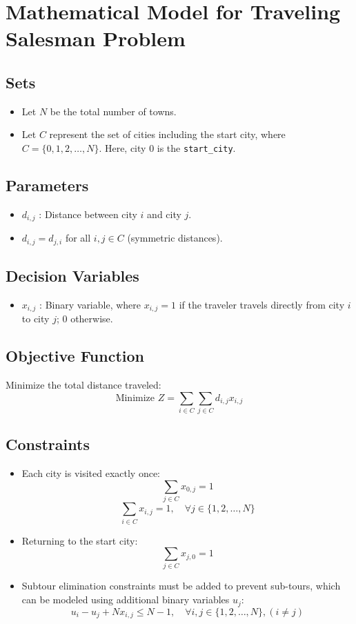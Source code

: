 \documentclass{article}
\begin{document}
\section*{Mathematical Model for Traveling Salesman Problem}

\subsection*{Sets}
\begin{itemize}
    \item Let \( N \) be the total number of towns.
    \item Let \( C \) represent the set of cities including the start city, where \( C = \{0, 1, 2, \ldots, N\} \). Here, city \( 0 \) is the \texttt{start\_city}.
\end{itemize}

\subsection*{Parameters}
\begin{itemize}
    \item \( d_{i,j} \) : Distance between city \( i \) and city \( j \).
    \item \( d_{i,j} = d_{j,i} \) for all \( i, j \in C \) (symmetric distances).
\end{itemize}

\subsection*{Decision Variables}
\begin{itemize}
    \item \( x_{i,j} \) : Binary variable, where \( x_{i,j} = 1 \) if the traveler travels directly from city \( i \) to city \( j \); \( 0 \) otherwise.
\end{itemize}

\subsection*{Objective Function}
Minimize the total distance traveled:
\[
\text{Minimize } Z = \sum_{i \in C} \sum_{j \in C} d_{i,j} x_{i,j}
\]

\subsection*{Constraints}
\begin{itemize}
    \item Each city is visited exactly once:
    \[
    \sum_{j \in C} x_{0,j} = 1
    \]
    \[
    \sum_{i \in C} x_{i,j} = 1, \quad \forall j \in \{1, 2, \ldots, N\}
    \]
    \item Returning to the start city:
    \[
    \sum_{j \in C} x_{j,0} = 1
    \]
    \item Subtour elimination constraints must be added to prevent sub-tours, which can be modeled using additional binary variables \( u_j \):
    \[
    u_i - u_j + N x_{i,j} \leq N - 1, \quad \forall i,j \in \{1, 2, \ldots, N\}, (i \neq j)
    \]
\end{itemize}
\end{document}
